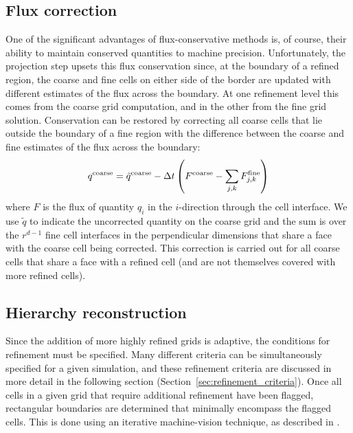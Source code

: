 \subsection{Flux correction}
\label{sec:flux_correction}

One of the significant advantages of flux-conservative methods is, of course, their ability to maintain conserved quantities to machine precision.  Unfortunately, the projection step upsets this flux conservation since, at the boundary of a refined region, the coarse and fine cells on either side of the border are updated with different estimates of the flux across the boundary.  At one refinement level this comes from the coarse grid computation, and in the other from the fine grid solution.  Conservation can be restored by correcting all coarse cells that lie outside the boundary of a fine region
with the difference between the coarse and fine estimates of the flux
across the boundary:
\begin{equation}
  q^{\rm coarse} = \tilde{q}^{\rm coarse} - \Delta t \left( F^{\rm
      coarse} - \sum_{j,k} F^{\rm fine}_{j,k} \right)
\end{equation}
where $F$ is the flux of quantity $q_i$ in the $i$-direction through the cell interface.   We use $\tilde{q}$ to indicate the uncorrected quantity on the coarse grid and the sum is over the $r^{d-1}$ fine cell interfaces in the perpendicular dimensions that share a face with the coarse cell being corrected.  This correction is carried out for all coarse cells that share a face with a refined cell (and are not themselves covered with more refined cells).

\subsection{Hierarchy reconstruction}
\label{sec:hierarchy_reconstruction}

Since the addition of more highly refined grids is adaptive, the conditions for refinement must be specified. Many different criteria can be simultaneously specified for a given simulation, and these refinement criteria are discussed in more detail in the following section (Section~\ref{sec:refinement_criteria}).   Once all cells in a given grid that require additional refinement have been flagged, rectangular boundaries are determined that minimally encompass the flagged cells.  This is done using an iterative machine-vision technique, as described in \cite{Berger91}.

